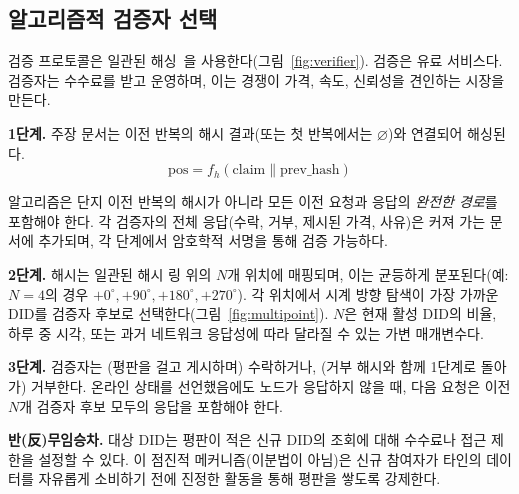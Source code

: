 \documentclass[11pt,a4paper,twocolumn]{article}
\begin{document}
\subsection{알고리즘적 검증자 선택}

검증 프로토콜은 일관된 해싱~\cite{karger1997}을 사용한다(그림~\ref{fig:verifier}). 검증은 유료 서비스다. 검증자는 수수료를 받고 운영하며, 이는 경쟁이 가격, 속도, 신뢰성을 견인하는 시장을 만든다.

\textbf{1단계.} 주장 문서는 이전 반복의 해시 결과(또는 첫 반복에서는 $\varnothing$)와 연결되어 해싱된다.
\begin{equation}
\text{pos} = f_h(\text{claim} \| \text{prev\_hash})
\label{eq:hash}
\end{equation}

알고리즘은 단지 이전 반복의 해시가 아니라 모든 이전 요청과 응답의 \emph{완전한 경로}를 포함해야 한다. 각 검증자의 전체 응답(수락, 거부, 제시된 가격, 사유)은 커져 가는 문서에 추가되며, 각 단계에서 암호학적 서명을 통해 검증 가능하다.

\textbf{2단계.} 해시는 일관된 해시 링 위의 $N$개 위치에 매핑되며, 이는 균등하게 분포된다(예: $N=4$의 경우 $+0^{\circ}, +90^{\circ}, +180^{\circ}, +270^{\circ}$). 각 위치에서 시계 방향 탐색이 가장 가까운 DID를 검증자 후보로 선택한다(그림~\ref{fig:multipoint}). $N$은 현재 활성 DID의 비율, 하루 중 시각, 또는 과거 네트워크 응답성에 따라 달라질 수 있는 가변 매개변수다.

\textbf{3단계.} 검증자는 (평판을 걸고 게시하며) 수락하거나, (거부 해시와 함께 1단계로 돌아가) 거부한다. 온라인 상태를 선언했음에도 노드가 응답하지 않을 때, 다음 요청은 이전 $N$개 검증자 후보 모두의 응답을 포함해야 한다.

\textbf{반(反)무임승차.} 대상 DID는 평판이 적은 신규 DID의 조회에 대해 수수료나 접근 제한을 설정할 수 있다. 이 점진적 메커니즘(이분법이 아님)은 신규 참여자가 타인의 데이터를 자유롭게 소비하기 전에 진정한 활동을 통해 평판을 쌓도록 강제한다.
\end{document}
